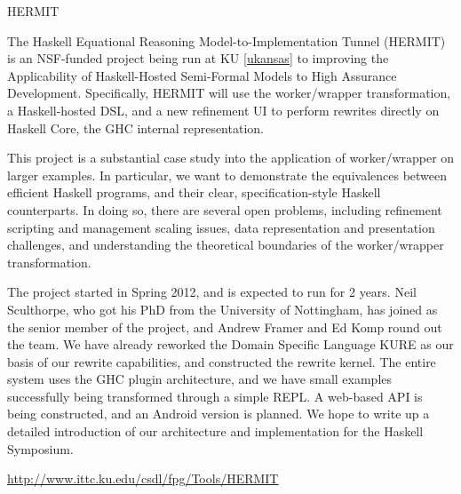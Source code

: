 \begin{hcarentry}{HERMIT}
\label{HERMIT}
\makeheader

The Haskell Equational Reasoning Model-to-Implementation Tunnel
(HERMIT) is an NSF-funded project being run at KU \cref{ukansas} to improving the
Applicability of Haskell-Hosted Semi-Formal Models to High Assurance
Development. Specifically, HERMIT will use the worker/wrapper
transformation, a Haskell-hosted DSL, and a new refinement UI to
perform rewrites directly on Haskell Core, the GHC internal
representation.

This project is a substantial case study into the application of
worker/wrapper on larger examples. In particular, we want to
demonstrate the equivalences between efficient Haskell programs, and
their clear, specification-style Haskell counterparts. In doing so,
there are several open problems, including refinement scripting and
management scaling issues, data representation and presentation
challenges, and understanding the theoretical boundaries of the
worker/wrapper transformation.

The project started in Spring 2012, and is expected to run
for 2 years. Neil Sculthorpe, who got his PhD from
the University of Nottingham, has joined as the senior member of the project,
and Andrew Framer and Ed Komp round
out the team. We have already reworked the Domain Specific Language
KURE as our basis of our rewrite capabilities, and constructed the
rewrite kernel. The entire system uses the GHC plugin architecture,
and we have small examples successfully being transformed through
a simple REPL. A web-based API is being constructed, and an
Android version is planned.
We hope to write up a detailed introduction of our architecture
and implementation for the Haskell Symposium.

\FurtherReading
  \url{http://www.ittc.ku.edu/csdl/fpg/Tools/HERMIT}
\end{hcarentry}
